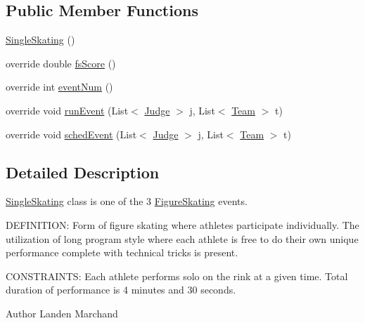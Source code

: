 \subsection*{Public Member Functions}
\begin{DoxyCompactItemize}
\item 
\hyperlink{classProject__Codename__Olympia__v1_1_1__0_1_1SingleSkating_a89d99bd660975fdbe65fc0a1390caaea}{Single\+Skating} ()
\item 
override double \hyperlink{classProject__Codename__Olympia__v1_1_1__0_1_1SingleSkating_a0f1837cfe29187ca1c2402f6312f2465}{fs\+Score} ()
\item 
override int \hyperlink{classProject__Codename__Olympia__v1_1_1__0_1_1SingleSkating_a651ceefab408b4cbe3106ed7d673ba79}{event\+Num} ()
\item 
override void \hyperlink{classProject__Codename__Olympia__v1_1_1__0_1_1SingleSkating_abf63b846664f64fe96a68a05787f79aa}{run\+Event} (List$<$ \hyperlink{classProject__Codename__Olympia__v1_1_1__0_1_1Judge}{Judge} $>$ j, List$<$ \hyperlink{classProject__Codename__Olympia__v1_1_1__0_1_1Team}{Team} $>$ t)
\item 
override void \hyperlink{classProject__Codename__Olympia__v1_1_1__0_1_1SingleSkating_a481a432870964cfce7c319572c794a55}{sched\+Event} (List$<$ \hyperlink{classProject__Codename__Olympia__v1_1_1__0_1_1Judge}{Judge} $>$ j, List$<$ \hyperlink{classProject__Codename__Olympia__v1_1_1__0_1_1Team}{Team} $>$ t)
\end{DoxyCompactItemize}


\subsection{Detailed Description}
\hyperlink{classProject__Codename__Olympia__v1_1_1__0_1_1SingleSkating}{Single\+Skating} class is one of the 3 \hyperlink{classProject__Codename__Olympia__v1_1_1__0_1_1FigureSkating}{Figure\+Skating} events. 

D\+E\+F\+I\+N\+I\+T\+I\+ON\+: Form of figure skating where athletes participate individually. The utilization of long program style where each athlete is free to do their own unique performance complete with technical tricks is present.

C\+O\+N\+S\+T\+R\+A\+I\+N\+TS\+: Each athlete performs solo on the rink at a given time. Total duration of performance is 4 minutes and 30 seconds.\begin{DoxyAuthor}{Author}
Landen Marchand 
\end{DoxyAuthor}


